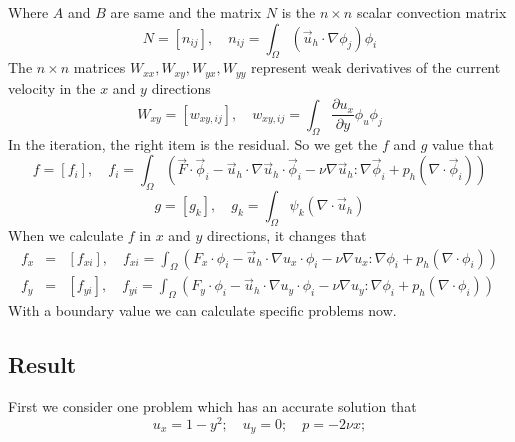 \documentclass[a4paper]{article}
\begin{document}
Where $A$ and $B$ are same and the matrix $N$ is the $n\times n$ scalar convection matrix
\begin{equation}
N = [n_{ij}], \quad n_{ij} = \int_{\Omega} (\vec{u}_h\cdot \nabla\phi_j)\phi_i
\label{mt::N}
\end{equation}
The $n\times n$ matrices $W_{xx}, W_{xy}, W_{yx}, W_{yy}$ represent weak derivatives of the current velocity in the $x$ and $y$ directions
\begin{equation}
W_{xy} = [w_{xy,ij}],\quad w_{xy,ij} = \int_{\Omega} \frac{\partial u_x}{\partial y}\phi_u \phi_j
\label{mt::W}
\end{equation}
In the iteration, the right item is the residual. So we get the $f$ and $g$ value that
\begin{equation}
f = [f_i],\quad f_i=\int_{\Omega}(\vec{F}\cdot\vec{\phi}_i-\vec{u}_h\cdot\nabla\vec{u}_h\cdot\vec{\phi}_i-\nu\nabla\vec{u}_h:\nabla\vec{\phi}_i+p_h(\nabla\cdot\vec{\phi}_i))
\end{equation}
\begin{equation}
g = [g_k],\quad g_k=\int_{\Omega}\psi_k(\nabla \cdot \vec{u}_h)
\end{equation}
When we calculate $f$ in $x$ and $y$ directions, it changes that
\begin{equation}
\begin{array}{rcl}
f_x &=& [f_{xi}],\quad f_{xi}=\int_{\Omega}(F_x\cdot\phi_i-\vec{u}_h\cdot\nabla u_x\cdot\phi_i-\nu\nabla u_x:\nabla\phi_i+p_h(\nabla\cdot\phi_i)) \\
f_y &=& [f_{yi}],\quad f_{yi}=\int_{\Omega}(F_y\cdot\phi_i-\vec{u}_h\cdot\nabla u_y\cdot\phi_i-\nu\nabla u_y:\nabla\phi_i+p_h(\nabla\cdot\phi_i))
\label{mt::f}
\end{array}
\end{equation}
With a boundary value we can calculate specific problems now.
\newpage
\subsection{Result}
First we consider one problem which has an accurate solution that
\begin{equation}
u_x = 1-y^2;\quad u_y = 0;\quad p=-2\nu x;
\label{pr::accurate}
\end{equation}
\end{document}
